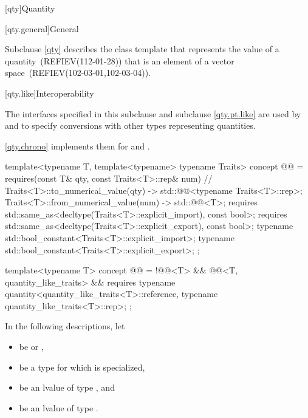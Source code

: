 [qty]{Quantity}

[qty.general]{General}

\pnum
Subclause \ref{qty} describes the class template 
that represents the value of a quantity~(REFIEV(112-01-28))
that is an element of a vector space~(REFIEV(102-03-01,102-03-04)).

[qty.like]{Interoperability}

\pnum
The interfaces specified in this subclause and subclause \ref{qty.pt.like}
are used by  and 
to specify conversions with other types representing quantities.
\begin{note}
\ref{qty.chrono} implements them for  and .
\end{note}

\begin{itemdecl}
template<typename T, template<typename> typename Traits>
concept @@ = requires(const T& qty, const Traits<T>::rep& num) {  // \expos
  { Traits<T>::to_numerical_value(qty) } -> std::@@<typename Traits<T>::rep>;
  { Traits<T>::from_numerical_value(num) } -> std::@@<T>;
  requires std::same_as<decltype(Traits<T>::explicit_import), const bool>;
  requires std::same_as<decltype(Traits<T>::explicit_export), const bool>;
  typename std::bool_constant<Traits<T>::explicit_import>;
  typename std::bool_constant<Traits<T>::explicit_export>;
};

template<typename T>
concept @@ = !@@<T> && @@<T, quantity_like_traits> && requires {
  typename quantity<quantity_like_traits<T>::reference, typename quantity_like_traits<T>::rep>;
};
\end{itemdecl}

\pnum
In the following descriptions, let
\begin{itemize}
\item
{} be  or ,
\item
{} be a type for which  is specialized,
\item
{} be an lvalue of type , and
\item
{} be an lvalue of type .
\end{itemize}

